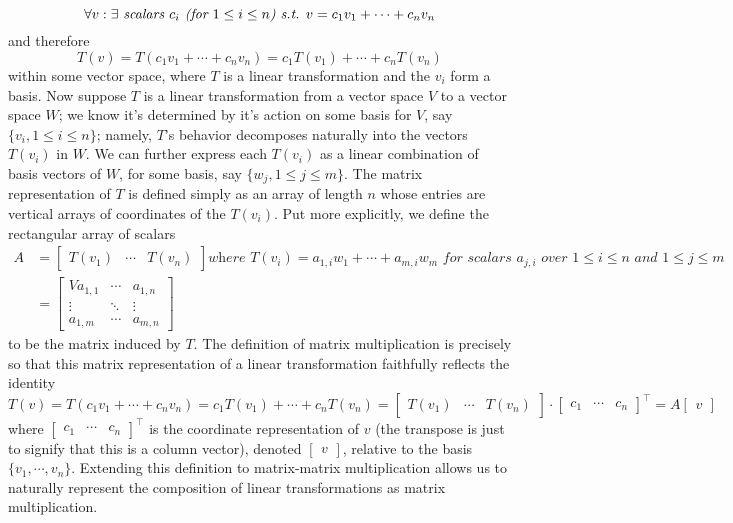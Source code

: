 \documentclass{article}
\newcommand{\sti}{\textit{ s.t. }}
\begin{document}
	$$ \forall v: \exists \textit{ scalars } c_i \textit{ (for $ 1 \leq i \leq n $)} \sti v = c_1 v_1 + \cdots + c_n v_n $$
and therefore
	$$ T(v) = T(c_1 v_1 + \cdots + c_n v_n) = c_1 T(v_1) + \cdots + c_n T(v_n) $$
within some vector space, where $ T $ is a linear transformation and the $ v_i $ form a basis. Now suppose $ T $ is a linear transformation from a vector space $ V $ to a vector space $ W $; we know it's determined by it's action on some basis for $ V $, say $ \{ v_i, 1 \leq i \leq n \} $; namely, $ T $'s behavior decomposes naturally into the vectors $ T(v_i) $ in $ W $. We can further express each $ T(v_i) $ as a linear combination of basis vectors of $ W $, for some basis, say $ \{ w_j, 1 \leq j \leq m \} $. The matrix representation of $ T $ is defined simply as an array of length $ n $ whose entries are vertical arrays of coordinates of the $ T(v_i) $. Put more explicitly, we define the rectangular array of scalars
	$$ \begin{aligned}
		A &= \begin{bmatrix} T(v_1) & \cdots & T(v_n) \end{bmatrix} \textit{where } T(v_i) = a_{1, i} w_1 + \cdots + a_{m, i} w_m \textit { for scalars } a_{j, i} \textit{ over } 1 \leq i \leq n \textit { and } 1 \leq j \leq m \\
		&= \begin{bmatrix}V
			a_{1, 1} & \cdots & a_{1, n} \\
	  		\vdots & \ddots & \vdots \\
		    a_{1, m} & \cdots & a_{m, n}
	    \end{bmatrix}
	\end{aligned} $$
to be the matrix induced by $ T $. The definition of matrix multiplication is precisely so that this matrix representation of a linear transformation faithfully reflects the identity
	$$ T(v) = T(c_1 v_1 + \cdots + c_n v_n) = c_1 T(v_1) + \cdots + c_n T(v_n) = \begin{bmatrix} T(v_1) & \cdots & T(v_n) \end{bmatrix} \cdot \begin{bmatrix} c_1 & \cdots & c_n \end{bmatrix}^\intercal = A \begin{bmatrix} v \end{bmatrix} $$
where $ \begin{bmatrix} c_1 & \cdots & c_n \end{bmatrix}^\intercal $ is the coordinate representation of $ v $ (the transpose is just to signify that this is a column vector), denoted $ \begin{bmatrix} v \end{bmatrix} $, relative to the basis $ \{ v_1, \cdots, v_n \} $. Extending this definition to matrix-matrix multiplication allows us to naturally represent the composition of linear transformations as matrix multiplication.
\end{document}
